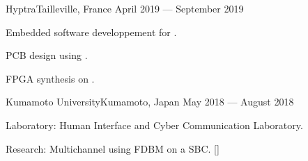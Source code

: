 
        {Hyptra}{Tailleville, France}
        {April 2019 --- September 2019}
        {
            \begin{additems}
                \item Embedded software developpement for .
                \item PCB design using .
                \item FPGA synthesis on .
            \end{additems}
        }

        {Kumamoto University}{Kumamoto, Japan}
        {May 2018 --- August 2018}
        {
            \begin{additems}
                \item Laboratory: Human Interface and Cyber Communication Laboratory.
                \item Research: Multichannel  using FDBM on a SBC. []
            \end{additems}
        }

